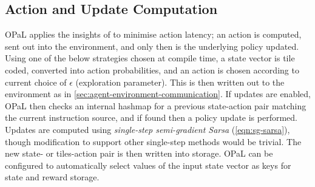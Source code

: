 \documentclass[sigconf,natbib=false]{acmart}
\newcommand{\approachshort}{OPaL}
\begin{document}
\subsection{Action and Update Computation}\label{sec:action-and-update-computation}
\approachshort{} applies the insights of \textcite{DBLP:journals/firai/TravnikMSP18} to minimise action latency; an action is computed, sent out into the environment, and only then is the underlying policy updated.
Using one of the below strategies chosen at compile time, a state vector is tile coded, converted into action probabilities, and an action is chosen according to current choice of $\epsilon$ (exploration parameter).
This is then written out to the environment as in \cref{sec:agent-environment-communication}.
If updates are enabled, \approachshort{} then checks an internal hashmap for a previous state-action pair matching the current instruction source, and if found then a policy update is performed.
Updates are computed using \emph{single-step semi-gradient Sarsa} (\cref{eqn:sg-sarsa}), though modification to support other single-step methods would be trivial.
The new state- or tiles-action pair is then written into storage.
\approachshort{} can be configured to automatically select values of the input state vector as keys for state and reward storage.
\end{document}
